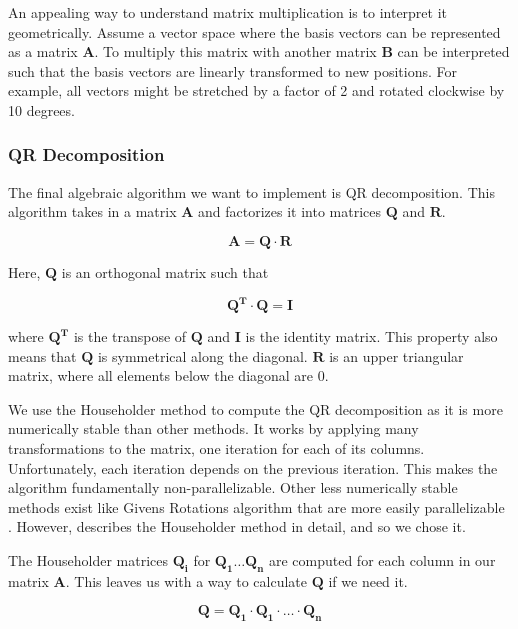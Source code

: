 An appealing way to understand matrix multiplication is to interpret it geometrically. Assume a vector space where the basis vectors can be represented as a matrix $\mathbf{A}$. To multiply this matrix with another matrix $\mathbf{B}$ can be interpreted such that the basis vectors are linearly transformed to new positions. For example, all vectors might be stretched by a factor of 2 and rotated clockwise by 10 degrees. 

\subsubsection{QR Decomposition}
The final algebraic algorithm we want to implement is QR decomposition. This algorithm takes in a matrix \(\mathbf{A}\) and factorizes it into matrices \(\mathbf{Q}\) and \(\mathbf{R}\).

\[\mathbf{A} = \mathbf{Q} \cdot \mathbf{R}\]

\noindent Here, \(\mathbf{Q}\) is an orthogonal matrix such that 

\[\mathbf{Q^T \cdot Q = I}\]

where \(\mathbf{Q^T}\) is the transpose of \(\mathbf{Q}\) and \(\mathbf{I}\) is the identity matrix. This property also means that \(\mathbf{Q}\) is symmetrical along the diagonal. \(\mathbf{R}\) is an upper triangular matrix, where all elements below the diagonal are 0. 


We use the Householder method to compute the QR decomposition as it is more numerically stable than other methods. It works by applying many transformations to the matrix, one iteration for each of its columns. Unfortunately, each iteration depends on the previous iteration. This makes the algorithm fundamentally non-parallelizable. Other less numerically stable methods exist like Givens Rotations algorithm that are more easily parallelizable \cite[Sect. 2.10.4]{numericalrecipes}. However, \cite[Sect. 11.2]{numericalrecipes} describes the Householder method in detail, and so we chose it. 

The Householder matrices \(\mathbf{Q_i}\) for \(\mathbf{Q_1 \ldots Q_{n}}\) are computed for each column in our matrix \(\mathbf{A}\). This leaves us with a way to calculate \(\mathbf{Q}\) if we need it.\cite[Sect. 2.13, 11.2]{numericalrecipes}

\[\mathbf{Q = Q_1 \cdot Q_1 \cdot \ldots \cdot Q_{n}}\]


